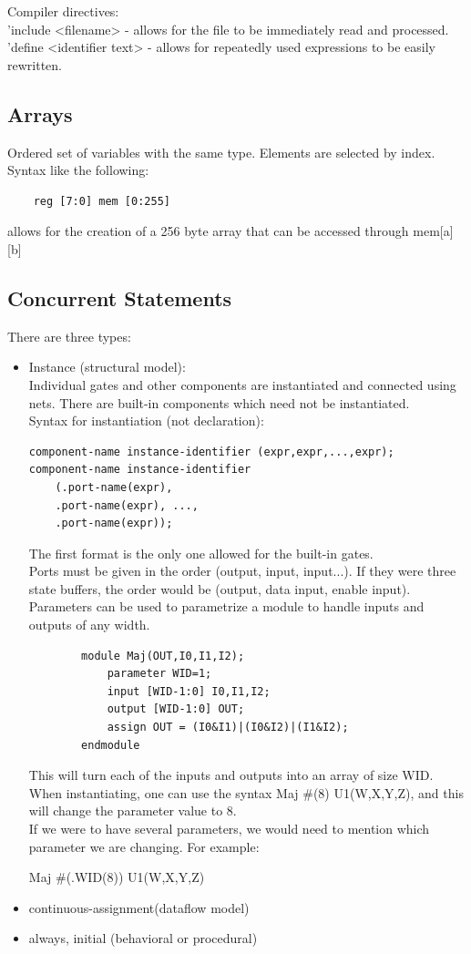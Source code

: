 \documentclass[nobib]{tufte-handout}
\begin{document}
Compiler directives:\\
'include <filename> - allows for the file to be immediately read and processed.\\
'define <identifier text> - allows for repeatedly used expressions to be easily rewritten.
\subsection{Arrays}
Ordered set of variables with the same type. Elements are selected by index. Syntax like the following:
\begin{lstlisting}
    reg [7:0] mem [0:255]
\end{lstlisting}
allows for the creation of a 256 byte array that can be accessed through mem[a][b]\\
\subsection{Concurrent Statements}
There are three types:\\
\begin{itemize}
    \item Instance (structural model):\\
    Individual gates and other components are instantiated and connected using nets. There are built-in components which need not be instantiated.\\
    Syntax for instantiation (not declaration):
    \begin{lstlisting}
component-name instance-identifier (expr,expr,...,expr);
component-name instance-identifier
    (.port-name(expr),
    .port-name(expr), ...,
    .port-name(expr));
    \end{lstlisting}
    The first format is the only one allowed for the built-in gates.\\ Ports must be given in the order (output, input, input...). If they were three state buffers, the order would be (output, data input, enable input).\\
    Parameters can be used to parametrize a module to handle inputs and outputs of any width. 
    \begin{lstlisting}
        module Maj(OUT,I0,I1,I2);
            parameter WID=1;
            input [WID-1:0] I0,I1,I2;
            output [WID-1:0] OUT;
            assign OUT = (I0&I1)|(I0&I2)|(I1&I2);
        endmodule
    \end{lstlisting}
    This will turn each of the inputs and outputs into an array of size WID.\\
    When instantiating, one can use the syntax Maj \#(8) U1(W,X,Y,Z), and this will change the parameter value to 8.\\
    If we were to have several parameters, we would need to mention which parameter we are changing. For example:\\
    \begin{center}
        Maj \#(.WID(8)) U1(W,X,Y,Z)
    \end{center}
    \item continuous-assignment(dataflow model)
    \item always, initial (behavioral or procedural)
\end{itemize}
\end{document}
